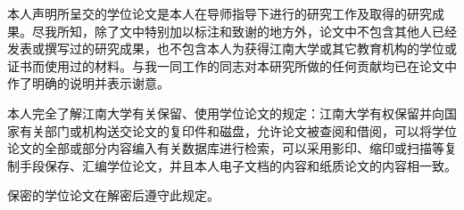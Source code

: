 {\fontsize{14bp}{25.2bp}\selectfont
\setlength{\parindent}{2\ccwd}
本人声明所呈交的学位论文是本人在导师指导下进行的研究工作及取得的研究成果。尽我所知，除了文中特别加以标注和致谢的地方外，论文中不包含其他人已经发表或撰写过的研究成果，也不包含本人为获得江南大学或其它教育机构的学位或证书而使用过的材料。与我一同工作的同志对本研究所做的任何贡献均已在论文中作了明确的说明并表示谢意。\par
\vspace{15.6bp}
\noindent{}\par
}
\vspace{25bp}
{\fontsize{14bp}{25.2bp}\selectfont
\setlength{\parindent}{2\ccwd}
本人完全了解江南大学有关保留、使用学位论文的规定：江南大学有权保留并向国家有关部门或机构送交论文的复印件和磁盘，允许论文被查阅和借阅，可以将学位论文的全部或部分内容编入有关数据库进行检索，可以采用影印、缩印或扫描等复制手段保存、汇编学位论文，并且本人电子文档的内容和纸质论文的内容相一致。\par
保密的学位论文在解密后遵守此规定。\par
\vspace{15.6bp}
\noindent{}\par
\vspace{10bp}
\noindent{}\par
}
